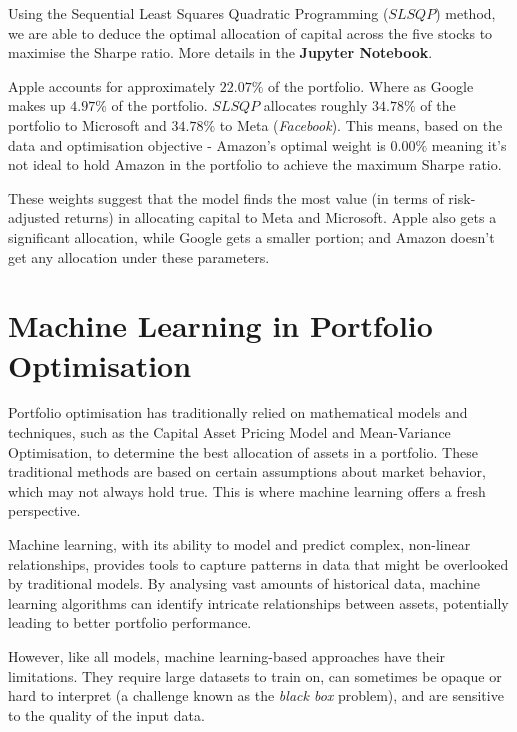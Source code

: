 \documentclass[a4paper,12pt,titlepage]{article}
\numberwithin{equation}{section}
\begin{document}
Using the Sequential Least Squares Quadratic Programming ($SLSQP$) method, we are able to deduce the optimal allocation of capital 
across the five stocks to maximise the Sharpe ratio. More details in the \textbf{Jupyter Notebook}. \newline \par \noindent Apple 
accounts for approximately $22.07\%$ of the portfolio. Where as Google makes up $4.97\%$ of the portfolio. $SLSQP$ allocates 
roughly $34.78\%$ of the portfolio to Microsoft and $34.78\%$ to Meta (\textit{Facebook}). This means, based on the data and optimisation 
objective - Amazon's optimal weight is $0.00\%$ meaning it's not ideal to hold Amazon in the portfolio to achieve the maximum 
Sharpe ratio. \newline \par \noindent These weights suggest that the model finds the most value (in terms of risk-adjusted returns) 
in allocating capital to Meta and Microsoft. Apple also gets a significant allocation, while Google gets a smaller portion; and 
Amazon doesn't get any allocation under these parameters.

\section{Machine Learning in Portfolio Optimisation}

Portfolio optimisation has traditionally relied on mathematical models and techniques, 
such as the Capital Asset Pricing Model and Mean-Variance Optimisation, 
to determine the best allocation of assets in a portfolio. These traditional methods are 
based on certain assumptions about market behavior, which may not always hold true. 
This is where machine learning offers a fresh perspective. \newline \par \noindent Machine learning, 
with its ability to model and predict complex, non-linear relationships, provides tools to capture 
patterns in data that might be overlooked by traditional models. By analysing vast amounts of 
historical data, machine learning algorithms can identify intricate relationships between assets, 
potentially leading to better portfolio performance. \newline \par \noindent However, like all models, 
machine learning-based approaches have their limitations. They require large datasets to train on, 
can sometimes be opaque or hard to interpret (a challenge known as the \textit{black box} problem), and 
are sensitive to the quality of the input data.
\end{document}
